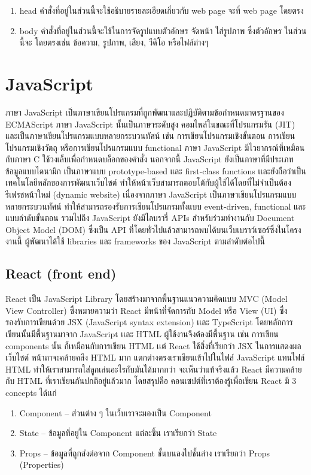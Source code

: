 \begin{enumerate}
  \item head คำสั่งที่อยู่ในส่วนนี้จะใช้อธิบายรายละเอียดเกี่ยวกับ web page จะที่ web page โดยตรง 
  \item body คำสั่งที่อยู่ในส่วนนี้จะใช้ในการจัดรูปแบบตัวอักษร จัดหน้า ใส่รูปภาพ ซึ่งตัวอักษร ในส่วนนี้จะ โดยตรงเช่น ข้อความ, รูปภาพ, เสียง, วีดิโอ หรือไฟล์ต่างๆ
  
\end{enumerate}

\section{JavaScript}

ภาษา JavaScript เป็นภาษาเขียนโปรแกรมที่ถูกพัฒนาและปฏิบัติตามข้อกำหนดมาตรฐานของ ECMAScript ภาษา JavaScript นั้นเป็นภาษาระดับสูง คอมไพล์ในขณะที่โปรแกรมรัน (JIT) และเป็นภาษาเขียนโปรแกรมแบบหลายกระบวนทัศน์ เช่น การเขียนโปรแกรมเชิงขั้นตอน การเขียนโปรแกรมเชิงวัตถุ หรือการเขียนโปรแกรมแบบ functional ภาษา JavaScript มีไวยากรณ์ที่เหมือนกับภาษา C ใช้วงเล็บเพื่อกำหนดบล็อกของคำสั่ง นอกจากนี้ JavaScript ยังเป็นภาษาที่มีประเภทข้อมูลแบบไดนามิก เป็นภาษาแบบ prototype-based และ first-class functions เเละยังถือว่าเป็นเทคโนโลยีหลักของการพัฒนาเว็บไซต์ ทำให้หน้าเว็บสามารถตอบโต้กับผู้ใช้ได้โดยที่ไม่จำเป็นต้องรีเฟรชหน้าใหม่ (dynamic website) เนื่องจากภาษา JavaScript เป็นภาษาเขียนโปรแกรมแบบหลายกระบวนทัศน์ ทำให้สามารถรองรับการเขียนโปรแกรมทั้งแบบ event-driven, functional และแบบลำดับขั้นตอน รวมไปถึง JavaScript ยังมีไลบรารี่ APIs สำหรับร่วมทำงานกับ Document Object Model (DOM) ซึ่งเป็น API ที่โดยทั่วไปแล้วสามารถพบได้บนเว็บเบราว์เซอร์ซึ่งในโครงงานนี้ ผู้พัฒนาได้ใช้ libraries และ frameworks ของ JavaScript ตามลำดับต่อไปนี้ 


\subsection{React (front end)}

React เป็น JavaScript Library โดยสร้างมาจากพื้นฐานแนวความคิดแบบ MVC (Model View Controller) ซึ่งหมายความว่า React มีหน้าที่จัดการกับ Model หรือ View (UI) ซึ่งรองรับการเขียนด้วย JSX (JavaScript syntax extension) เเละ TypeScript โดยหลักการเขียนนั้นมีพื้นฐานมาจาก JavaScript เเละ HTML ผู้ใช้งานจึงต้องมีพื้นฐาน เช่น การเขียน components นั้น ก็เหมือนกับการเขียน HTML เเต่  React ใช้สิ่งที่เรียกว่า JSX ในการแสดงผลเว็บไซต์ หน้าตาจะคล้ายคลึง HTML มาก แตกต่างตรงเราเขียนเข้าไปในไฟล์ JavaScript แทนไฟล์ HTML ทำให้เราสามารถใส่ลูกเล่นอะไรกับมันได้มากกว่า จะเห็นว่าแท้จริงแล้ว React มีความคล้ายกับ HTML ที่เราเขียนกันปกติอยู่แล้วมาก โดยสรุปคือ คอนเซปต์ที่เราต้องรู้เพื่อเขียน React มี 3 concepts ได้เเก่
%
\begin{enumerate}
  \item Component – ส่วนต่าง ๆ ในเว็บเราจะมองเป็น Component
  \item State – ข้อมูลที่อยู่ใน Component แต่ละชิ้น เราเรียกว่า State
  \item Props – ข้อมูลที่ถูกส่งต่อจาก Component ชั้นบนลงไปชั้นล่าง เราเรียกว่า Props (Properties)
\end{enumerate}

